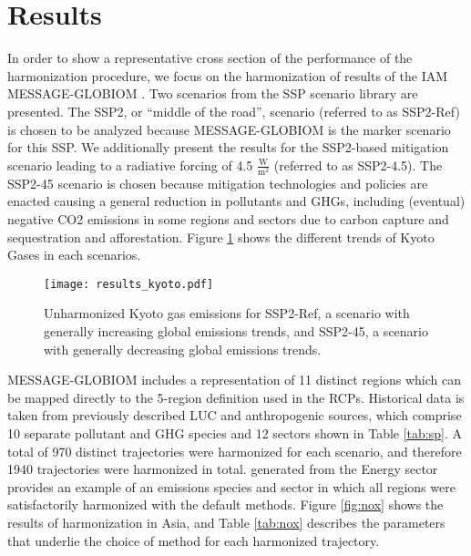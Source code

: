 \section{Results}\label{sec:results}

In order to show a representative cross section of the performance of the
 harmonization procedure, we focus on the harmonization of results
of the IAM MESSAGE-GLOBIOM \cite{fricko_marker_2017}. Two scenarios from the SSP
scenario library \cite{Riahi2017153,Rao2017346} are presented. The SSP2, or
``middle of the road'', scenario (referred to as SSP2-Ref) is chosen to be
analyzed because MESSAGE-GLOBIOM is the marker scenario for this SSP. We
additionally present the results for the SSP2-based mitigation scenario leading
to a radiative forcing of 4.5 $\frac{\text{W}}{\text{m}^2}$ (referred to as
SSP2-4.5). The SSP2-45 scenario is chosen because mitigation technologies and
policies are enacted causing a general reduction in pollutants and GHGs,
including (eventual) negative CO2 emissions in some regions and sectors due to
carbon capture and sequestration and afforestation. Figure \ref{fig:kyoto} shows
the different trends of Kyoto Gases in each scenarios.


\begin{figure}
  \begin{center}
    \texttt{[image: results\_kyoto.pdf]}
    \caption[]{
      \label{fig:kyoto}
      Unharmonized Kyoto gas emissions for SSP2-Ref, a scenario with generally
      increasing global emissions trends, and SSP2-45, a scenario with generally
      decreasing global emissions trends.  }
  \end{center}
\end{figure}


MESSAGE-GLOBIOM includes a representation of 11 distinct regions which can be
mapped directly to the 5-region definition used in the RCPs. Historical data is
taken from previously described LUC and anthropogenic sources, which comprise 10
separate pollutant and GHG species and 12 sectors shown in Table \ref{tab:sp}. A
total of 970 distinct trajectories were harmonized for each scenario, and
therefore 1940 trajectories were harmonized in total. \noxx generated from the
Energy sector provides an example of an emissions species and sector in which
all regions were satisfactorily harmonized with the default methods. Figure
\ref{fig:nox} shows the results of harmonization in Asia, and Table
\ref{tab:nox} describes the parameters that underlie the choice of method for
each harmonized trajectory.

